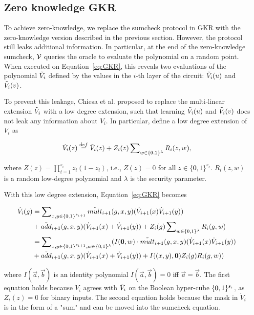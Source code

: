 \subsection{Zero knowledge GKR}\label{subsec::zkgkr}

To achieve zero-knowledge, we replace the sumcheck protocol in GKR with the zero-knowledge version described in the previous section. However, the protocol still leaks additional information. In particular, at the end of the zero-knowledge sumcheck, $\mathcal{V}$ queries the oracle to evaluate the polynomial on a random point. When executed on Equation~\ref{eq:GKR}, this reveals two evaluations of the polynomial $\tilde{V}_i$ defined by the values in the $i$-th layer of the circuit: $\tilde{V}_i(u)$ and $\tilde{V}_i(v)$.


To prevent this leakage, Chiesa et al.\cite{zksumcheck} proposed to replace the multi-linear extension $\tilde{V}_i$ with a low degree extension, such that learning $\tilde{V}_i(u)$ and $\tilde{V}_i(v)$ does not leak any information about $V_i$. In particular, define a low degree extension of $V_i$ as 

\begin{equation}\label{eq:lde}
\dot{V}_{i}(z) \overset{def}{=} \tilde{V}_i(z)+Z_i(z)\sum\nolimits_{w \in \{0, 1\}^\lambda}R_i(z, w),
\end{equation}

where $Z(z) = \prod_{i=1}^{s_i} z_i(1-z_i)$, i.e., $Z(z)=0$ for all $z\in\{0, 1\}^{s_i}$. $R_i(z,w)$ is a random low-degree polynomial and $\lambda$ is the security parameter. 

With this low degree extension, Equation~\ref{eq:GKR} becomes

\begin{align}\label{eq:zkGKR}
\dot{V}_{i}(g)&=\sum\nolimits_{x, y\in \binary^{s_{i+1}}}\tilde{mult}_{i+1}(g, x, y)(\dot{V}_{i+1}(x)\dot{V}_{i+1}(y))\\
&+\tilde{add}_{i+1}(g,x,y)(\dot{V}_{i+1}(x)+\dot{V}_{i+1}(y))\nonumber + Z_i(g)\sum\nolimits_{w \in \binary^\lambda}R_i(g, w)\nonumber\\
&=\sum\nolimits_{x, y\in \binary^{s_{i+1}},w \in \binary^\lambda}(I(\vec{0},w) \cdot \tilde{mult}_{i+1}(g, x, y)(\dot{V}_{i+1}(x)\dot{V}_{i+1}(y))\\
&+\tilde{add}_{i+1}(g,x,y)(\dot{V}_{i+1}(x)+\dot{V}_{i+1}(y))\nonumber + I((x, y), \vec{0})Z_i(g)R_i(g, w))
\end{align}

where $I(\vec{a},\vec{b})$ is an identity polynomial $I(\vec{a},\vec{b}) = 0$ iff $\vec{a}=\vec{b}$. The first equation holds because $\dot{V}_i$ agrees with $\tilde{V}_i$ on the Boolean hyper-cube $\{0,1\}^{s_i}$, as $Z_i(z) = 0$ for binary inputs. The second equation holds because the mask in $\dot{V}_i$ is in the form of a "sum" and can be moved into the sumcheck equation. 

